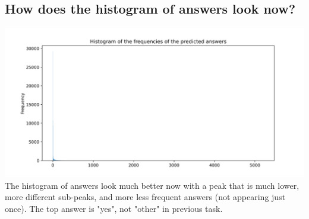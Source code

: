 \documentclass{article}
\begin{document}
\subsection{How does the histogram of answers look now?}
\includegraphics[width=\textwidth]{q3.3.png}
The histogram of answers look much better now with a peak that is much lower, more different sub-peaks, and more less frequent answers (not appearing just once). The top answer is "yes", not "other" in previous task.
\end{document}
